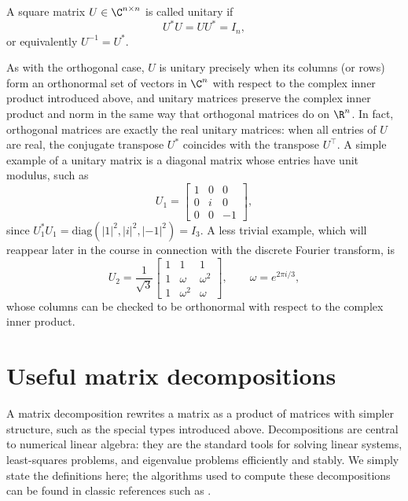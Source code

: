 \begin{definition}
    A square matrix $U \in \C^{n \times n}$ is called unitary if
    \begin{equation*}
        U^* U = U U^* = I_n,
    \end{equation*}
    or equivalently $U^{-1} = U^*$.
\end{definition}
As with the orthogonal case, $U$ is unitary precisely when its columns (or rows) form an orthonormal set of vectors in $\C^n$ with respect to the complex inner product introduced above, and unitary matrices preserve the complex inner product and norm in the same way that orthogonal matrices do on $\R^n$. In fact, orthogonal matrices are exactly the real unitary matrices: when all entries of $U$ are real, the conjugate transpose $U^*$ coincides with the transpose $U^\top$. A simple example of a unitary matrix is a diagonal matrix whose entries have unit modulus, such as
\begin{equation*}
    U_1 = \begin{bmatrix}
        1 & 0 & 0 \\
        0 & i & 0 \\
        0 & 0 & -1
    \end{bmatrix},
\end{equation*}
since $U_1^* U_1 = \mathrm{diag}(|1|^2, |i|^2, |-1|^2) = I_3$. A less trivial example, which will reappear later in the course in connection with the discrete Fourier transform, is
\begin{equation*}
    U_2 = \frac{1}{\sqrt{3}}\begin{bmatrix}
        1 & 1 & 1 \\
        1 & \omega & \omega^2 \\
        1 & \omega^2 & \omega
    \end{bmatrix}, \qquad \omega = e^{2\pi i/3},
\end{equation*}
whose columns can be checked to be orthonormal with respect to the complex inner product.

\section{Useful matrix decompositions}

A matrix decomposition rewrites a matrix as a product of matrices with simpler structure, such as the special types introduced above. Decompositions are central to numerical linear algebra: they are the standard tools for solving linear systems, least-squares problems, and eigenvalue problems efficiently and stably. We simply state the definitions here; the algorithms used to compute these decompositions can be 
found in classic references such as \cite{demmel1997applied,olver2006applied}.

